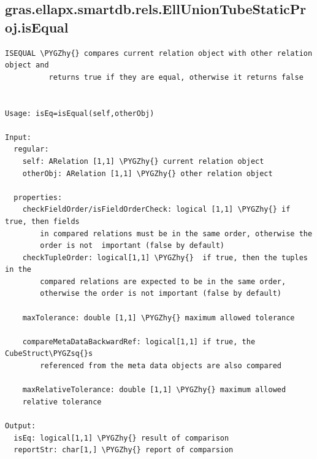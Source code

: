 \documentclass[letterpaper,10pt,english]{sphinxmanual}
\def\PYGZhy{\char`\-}
\def\PYGZsq{\char`\'}
\begin{document}
\subsection{gras.ellapx.smartdb.rels.EllUnionTubeStaticProj.isEqual}
\label{chap_functions:gras-ellapx-smartdb-rels-elluniontubestaticproj-isequal}
\begin{Verbatim}[commandchars=\\\{\}]
ISEQUAL \PYGZhy{} compares current relation object with other relation object and
          returns true if they are equal, otherwise it returns false


Usage: isEq=isEqual(self,otherObj)

Input:
  regular:
    self: ARelation [1,1] \PYGZhy{} current relation object
    otherObj: ARelation [1,1] \PYGZhy{} other relation object

  properties:
    checkFieldOrder/isFieldOrderCheck: logical [1,1] \PYGZhy{} if true, then fields
        in compared relations must be in the same order, otherwise the
        order is not  important (false by default)
    checkTupleOrder: logical[1,1] \PYGZhy{}  if true, then the tuples in the
        compared relations are expected to be in the same order,
        otherwise the order is not important (false by default)

    maxTolerance: double [1,1] \PYGZhy{} maximum allowed tolerance

    compareMetaDataBackwardRef: logical[1,1] if true, the CubeStruct\PYGZsq{}s
        referenced from the meta data objects are also compared

    maxRelativeTolerance: double [1,1] \PYGZhy{} maximum allowed
    relative tolerance

Output:
  isEq: logical[1,1] \PYGZhy{} result of comparison
  reportStr: char[1,] \PYGZhy{} report of comparsion
\end{Verbatim}
\end{document}
